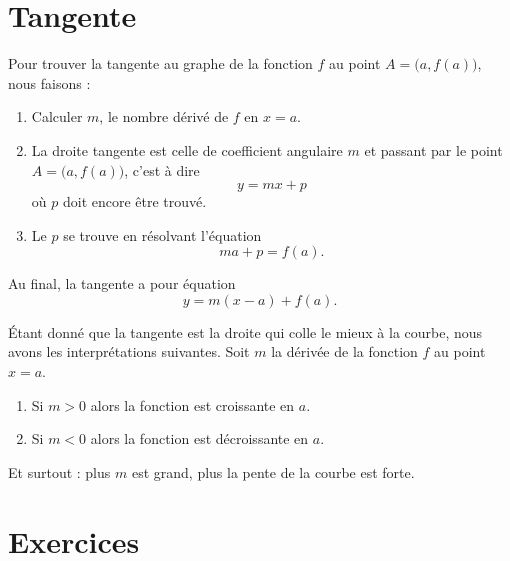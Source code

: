\section{Tangente}

\begin{Aretenir}
    Pour trouver la tangente au graphe de la fonction \( f\) au point \( A=\big( a,f(a) \big)\), nous faisons :
    \begin{enumerate}
        \item
            Calculer \( m\), le nombre dérivé de $f$ en \( x=a\).
        \item
            La droite tangente est celle de coefficient angulaire \( m\) et passant par le point \( A=\big( a,f(a) \big)\), c'est à dire
            \begin{equation}
                y=mx+p
            \end{equation}
            où \( p\) doit encore être trouvé.
        \item
            Le \( p\) se trouve en résolvant l'équation
            \begin{equation}
                ma+p=f(a).
            \end{equation}
    \end{enumerate}
    Au final, la tangente a pour équation
    \begin{equation}
        y=m(x-a)+f(a).
    \end{equation}
\end{Aretenir}

Étant donné que la tangente est la droite qui colle le mieux à la courbe, nous avons les interprétations suivantes. Soit \( m\) la dérivée de la fonction \( f\) au point \( x=a\).
\begin{enumerate}
    \item
        Si \( m>0\) alors la fonction est croissante en \( a\).
    \item
        Si \( m<0\) alors la fonction est décroissante en \( a\).
\end{enumerate}
Et surtout : plus \( m\) est grand, plus la pente de la courbe est forte.

\section{Exercices}

